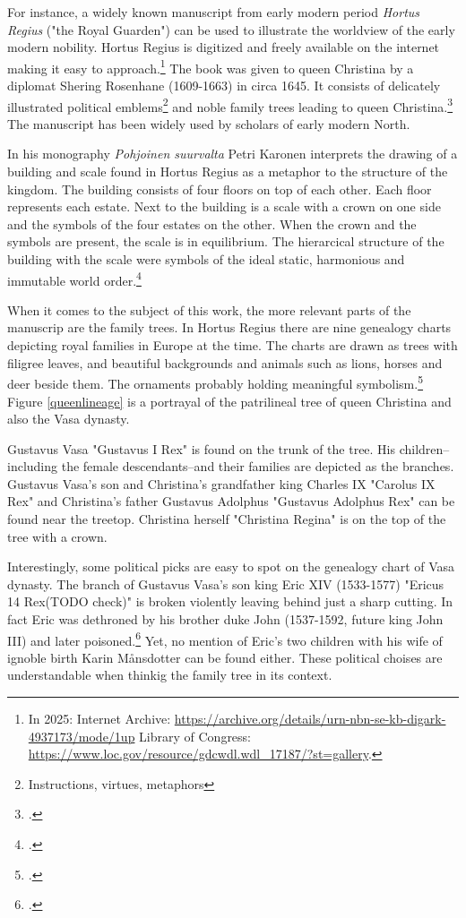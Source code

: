 For instance, a widely known manuscript from early modern period \textit{Hortus Regius} ("the Royal Guarden") can be used to illustrate the worldview of the early modern nobility. Hortus Regius is digitized and freely available on the internet making it easy to approach.\footnote{In 2025: Internet Archive: \url{https://archive.org/details/urn-nbn-se-kb-digark-4937173/mode/1up} Library of Congress: \url{https://www.loc.gov/resource/gdcwdl.wdl\_17187/?st=gallery}.} The book was given to queen Christina by a diplomat Shering Rosenhane (1609-1663) in circa 1645. It consists of delicately illustrated political emblems\footnote{Instructions, virtues, metaphors} and noble family trees leading to queen Christina.\footcites{congresslibrary}[p. 271.]{BlennowAnna} The manuscript has been widely used by scholars of early modern North.

In his monography \textit{Pohjoinen suurvalta} Petri Karonen interprets the drawing of a building and scale found in Hortus Regius as a metaphor to the structure of the kingdom. The building consists of four floors on top of each other. Each floor represents each estate. Next to the building is a scale with a crown on one side and the symbols of the four estates on the other. When the crown and the symbols are present, the scale is in equilibrium. The hierarcical structure of the building with the scale were symbols of the ideal static, harmonious and immutable world order.\footcite[p. 162-165.]{pSuurvalta}

When it comes to the subject of this work, the more relevant parts of the manuscrip are the family trees. In Hortus Regius there are nine genealogy charts depicting royal families in Europe at the time. The charts are drawn as trees with filigree leaves, and beautiful backgrounds and animals such as lions, horses and deer beside them. The ornaments probably holding meaningful symbolism.\footcite{hortusregius} Figure \ref{queenlineage} is a portrayal of the patrilineal tree of queen Christina and also the Vasa dynasty.

Gustavus Vasa "Gustavus I Rex" is found on the trunk of the tree. His children–including the female descendants–and their families are depicted as the branches. Gustavus Vasa's son and Christina's grandfather king Charles IX "Carolus IX Rex" and Christina's father Gustavus Adolphus "Gustavus Adolphus Rex" can be found near the treetop. Christina herself "Christina Regina" is on the top of the tree with a crown. 

Interestingly, some political picks are easy to spot on the genealogy chart of Vasa dynasty. The branch of Gustavus Vasa's son king Eric XIV (1533-1577) "Ericus 14 Rex(TODO check)" is broken violently leaving behind just a sharp cutting. In fact Eric was dethroned by his brother duke John (1537-1592, future king John III) and later poisoned.\footcite[p. 118-124.]{MelinEtAl} Yet, no mention of Eric's two children with his wife of ignoble birth Karin Månsdotter can be found either. These political choises are understandable when thinkig the family tree in its context. 

